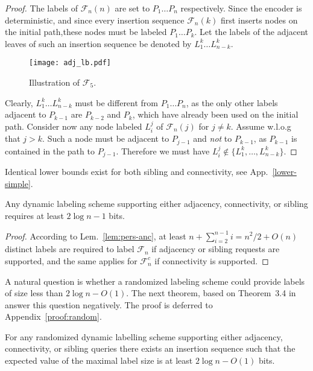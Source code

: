 \documentclass{llncs}
\begin{document}
\begin{proof}
The labels of $\mathcal{F}_n(n)$ are set to  $P_1 \dots P_n$ respectively.
Since the encoder is deterministic, and since every insertion sequence
$\mathcal{F}_n(k)$ first  inserts nodes on the initial  path,these nodes must be labeled
$P_1 \dots P_k$. Let the labels of the adjacent leaves of such an insertion
sequence be denoted by $L^k_1 \dots L^k_{n-k}$.

			\begin{figure} [h]
				\centering
				\texttt{[image: adj\_lb.pdf]}
				\caption{Illustration of $\mathcal{F}_5$. }
				\label{fig:AdjLowerBound}
			\end{figure}


Clearly, $L_1^{k}\dots L_{n-k}^{k}$ must be different from $P_1\dots P_n$, as the only other labels adjacent to $P_{k-1}$ are $P_{k-2}$ and $P_{k}$, which have already been used on the initial path.
 Consider now any node labeled $L_i^j$ of $\mathcal{F}_n(j)$ for $j\ne k$. Assume w.l.o.g that $j>k$. Such a node must be adjacent to $P_{j-1}$ and
 \emph{not} to $P_{k-1}$, as $P_{k-1}$ is contained in the path to $P_{j-1}$. Therefore we must have $L_i^j \notin \{L_1^{k}, \dots, L_{n-k}^{k}\}$.
\end{proof}

Identical lower bounds exist for both sibling and connectivity, see App.~\ref{lower-simple}.
\begin{theorem}\label{thm:simple-dyn}
Any dynamic labeling scheme supporting either  adjacency, connectivity, or sibling  requires at least $ 2 \log n -1 $ bits.
\end{theorem}
\begin{proof}
According to Lem.~\ref{lem:pers-anc}, at least $n+ \sum_{i=2}^{n-1} i =  n^2/2
+O(n)$ distinct labels are required to label $\mathcal{F}_n$ if adjacency or
sibling requests are supported, and the same applies for $\mathcal{F}^c_n$  if
connectivity is supported.
\end{proof}


A natural question is whether a randomized labeling scheme could provide labels of size less than $2 \log n - O(1)$.
The next theorem, based on Theorem~3.4 in \cite{cohen2010labeling} answer this question negatively. The proof is deferred to Appendix~\ref{proof:random}.
\begin{theorem}\label{thm:random}
	For any randomized dynamic labelling scheme supporting either
	adjacency, connectivity, or sibling queries
	there exists an insertion sequence such that the expected value
	of the maximal label size is at least $2 \log n - O(1)$ bits.
\end{theorem}
\end{document}
